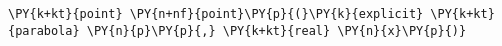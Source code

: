 \begin{Verbatim}[commandchars=\\\{\}]
    \PY{k+kt}{point} \PY{n+nf}{point}\PY{p}{(}\PY{k}{explicit} \PY{k+kt}{parabola} \PY{n}{p}\PY{p}{,} \PY{k+kt}{real} \PY{n}{x}\PY{p}{)}
\end{Verbatim}
